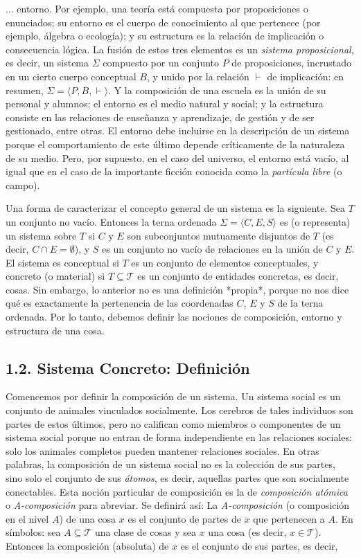 {\fontsize{13}{15}\selectfont
... entorno. Por ejemplo, una teoría está compuesta por proposiciones o enunciados; su entorno es el cuerpo de conocimiento al que pertenece (por ejemplo, álgebra o ecología); y su estructura es la relación de implicación o consecuencia lógica. La fusión de estos tres elementos es un \textit{sistema proposicional}, es decir, un sistema $\Sigma$ compuesto por un conjunto $P$ de proposiciones, incrustado en un cierto cuerpo conceptual $B$, y unido por la relación $\vdash$ de implicación: en resumen, $\Sigma = \langle P, B, \vdash \rangle$. Y la composición de una escuela es la unión de su personal y alumnos; el entorno es el medio natural y social; y la estructura consiste en las relaciones de enseñanza y aprendizaje, de gestión y de ser gestionado, entre otras. El entorno debe incluirse en la descripción de un sistema porque el comportamiento de este último depende críticamente de la naturaleza de su medio. Pero, por supuesto, en el caso del universo, el entorno está vacío, al igual que en el caso de la importante ficción conocida como la \textit{partícula libre} (o campo).

Una forma de caracterizar el concepto general de un sistema es la siguiente. Sea $T$ un conjunto no vacío. Entonces la terna ordenada $\Sigma = \langle C, E, S \rangle$ es (o representa) un sistema sobre $T$ si $C$ y $E$ son subconjuntos mutuamente disjuntos de $T$ (es decir, $C \cap E = \emptyset$), y $S$ es un conjunto no vacío de relaciones en la unión de $C$ y $E$. El sistema es conceptual si $T$ es un conjunto de elementos conceptuales, y concreto (o material) si $T \subseteq \mathcal{T}$ es un conjunto de entidades concretas, es decir, cosas. Sin embargo, lo anterior no es una definición *propia*, porque no nos dice qué es exactamente la pertenencia de las coordenadas $C$, $E$ y $S$ de la terna ordenada. Por lo tanto, debemos definir las nociones de composición, entorno y estructura de una cosa.

\subsection*{1.2. Sistema Concreto: Definición}
Comencemos por definir la composición de un sistema. Un sistema social es un conjunto de animales vinculados socialmente. Los cerebros de tales individuos son partes de estos últimos, pero no califican como miembros o componentes de un sistema social porque no entran de forma independiente en las relaciones sociales: solo los animales completos pueden mantener relaciones sociales. En otras palabras, la composición de un sistema social no es la colección de sus partes, sino solo el conjunto de sus \textit{átomos}, es decir, aquellas partes que son socialmente conectables. Esta noción particular de composición es la de \textit{composición atómica} o \textit{A-composición} para abreviar. Se definirá así: La \textit{A-composición} (o composición en el nivel $A$) de una cosa $x$ es el conjunto de partes de $x$ que pertenecen a $A$. En símbolos: sea $A \subseteq \mathcal{T}$ una clase de cosas y sea $x$ una cosa (es decir, $x \in \mathcal{T}$). Entonces la composición (absoluta) de $x$ es el conjunto de sus partes, es decir,
}

